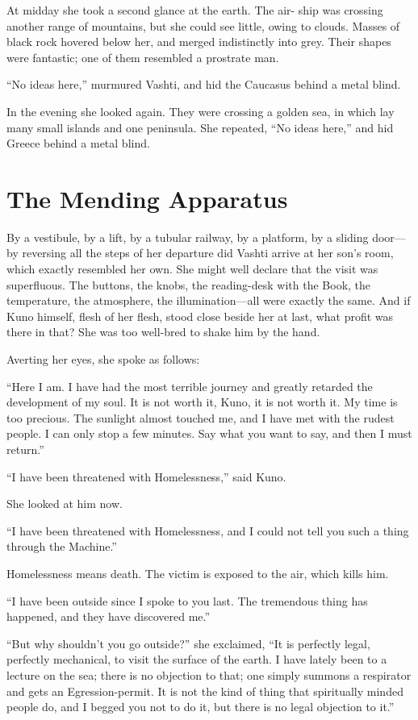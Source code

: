 At midday she took a second glance at the earth. The air- ship was crossing another range of mountains, but she could see little, owing to clouds. Masses of black rock hovered below her, and merged indistinctly into grey. Their shapes were fantastic; one of them resembled a prostrate man.

``No ideas here,'' murmured Vashti, and hid the Caucasus behind a metal blind.

In the evening she looked again. They were crossing a golden sea, in which lay many small islands and one peninsula. She repeated, ``No ideas here,'' and hid Greece behind a metal blind.



\section{The Mending Apparatus}

By a vestibule, by a lift, by a tubular railway, by a platform, by a sliding door---by reversing all the steps of her departure did Vashti arrive at her son's room, which exactly resembled her own. She might well declare that the visit was superfluous. The buttons, the knobs, the reading-desk with the Book, the temperature, the atmosphere, the illumination---all were exactly the same. And if Kuno himself, flesh of her flesh, stood close beside her at last, what profit was there in that? She was too well-bred to shake him by the hand.

Averting her eyes, she spoke as follows:

``Here I am. I have had the most terrible journey and greatly retarded the development of my soul. It is not worth it, Kuno, it is not worth it. My time is too precious. The sunlight almost touched me, and I have met with the rudest people. I can only stop a few minutes. Say what you want to say, and then I must return.''

``I have been threatened with Homelessness,'' said Kuno.

She looked at him now.

``I have been threatened with Homelessness, and I could not tell you such a thing through the Machine.''

Homelessness means death. The victim is exposed to the air, which kills him.

``I have been outside since I spoke to you last. The tremendous thing has happened, and they have discovered me.''

``But why shouldn't you go outside?'' she exclaimed, ``It is perfectly legal, perfectly mechanical, to visit the surface of the earth. I have lately been to a lecture on the sea; there is no objection to that; one simply summons a respirator and gets an Egression-permit. It is not the kind of thing that spiritually minded people do, and I begged you not to do it, but there is no legal objection to it.''

